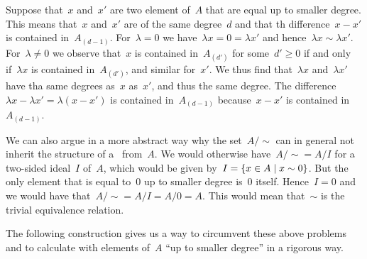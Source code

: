 \begin{fluff}
\begin{itemize}
      Suppose that~$x$ and~$x'$ are two element of~$A$ that are equal up to smaller degree.
      This means that~$x$ and~$x'$ are of the same degree~$d$ and that th difference~$x - x'$ is contained in~$A_{(d-1)}$.
      For~$\lambda = 0$ we have~$\lambda x = 0 = \lambda x'$ and hence~$\lambda x \sim \lambda x'$.
      For~$\lambda \neq 0$ we observe that~$x$ is contained in~$A_{(d')}$ for some~$d' \geq 0$ if and only if~$\lambda x$ is contained in~$A_{(d')}$, and similar for~$x'$.
      We thus find that~$\lambda x$ and~$\lambda x'$ have tha same degrees as~$x$ as~$x'$, and thus the same degree.
      The difference~$\lambda x - \lambda x' = \lambda (x - x')$ is contained in~$A_{(d-1)}$ because~$x - x'$ is contained in~$A_{(d-1)}$.
  \end{itemize}

  We can also argue in a more abstract way why the set~$A / {\sim}$ can in general not inherit the structure of a~\algebra{$\kf$} from~$A$.
  We would otherwise have~$A/{\sim} = A/I$ for a two-sided ideal~$I$ of~$A$, which would be given by~$I = \{x \in A \suchthat x \sim 0\}$.
  But the only element that is equal to~$0$ up to smaller degree is~$0$ itself.
  Hence~$I = 0$ and we would have that~$A/{\sim} = A / I = A / 0 = A$.
  This would mean that~$\sim$ is the trivial equivalence relation.
\end{fluff}


\begin{fluff}
  The following construction gives us a way to circumvent these above problems and to calculate with elements of~$A$ \enquote{up to smaller degree} in a rigorous way.
\end{fluff}


